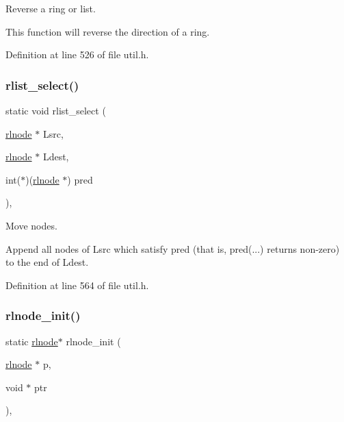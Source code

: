 Reverse a ring or list. 

This function will reverse the direction of a ring. 

Definition at line 526 of file util.\+h.

\mbox{\label{group__rlists_ga6016cbc055d242a03d823ebfec422c2b}} 
\subsubsection{\texorpdfstring{rlist\+\_\+select()}{rlist\_select()}}
{\footnotesize\ttfamily static void rlist\+\_\+select (\begin{DoxyParamCaption}\item[{\hyperlink{group__rlists_ga8f6244877f7ce2322c90525217ea6e7a}{rlnode} $\ast$}]{Lsrc,  }\item[{\hyperlink{group__rlists_ga8f6244877f7ce2322c90525217ea6e7a}{rlnode} $\ast$}]{Ldest,  }\item[{int($\ast$)(\hyperlink{group__rlists_ga8f6244877f7ce2322c90525217ea6e7a}{rlnode} $\ast$)}]{pred }\end{DoxyParamCaption})\hspace{0.3cm}{\ttfamily [inline]}, {\ttfamily [static]}}



Move nodes. 

Append all nodes of Lsrc which satisfy pred (that is, pred(...) returns non-\/zero) to the end of Ldest. 

Definition at line 564 of file util.\+h.

\mbox{\label{group__rlists_ga578e6dc256d4f1580bd8500edf374aca}} 
\subsubsection{\texorpdfstring{rlnode\+\_\+init()}{rlnode\_init()}}
{\footnotesize\ttfamily static \hyperlink{group__rlists_ga8f6244877f7ce2322c90525217ea6e7a}{rlnode}$\ast$ rlnode\+\_\+init (\begin{DoxyParamCaption}\item[{\hyperlink{group__rlists_ga8f6244877f7ce2322c90525217ea6e7a}{rlnode} $\ast$}]{p,  }\item[{void $\ast$}]{ptr }\end{DoxyParamCaption})\hspace{0.3cm}{\ttfamily [inline]}, {\ttfamily [static]}}



